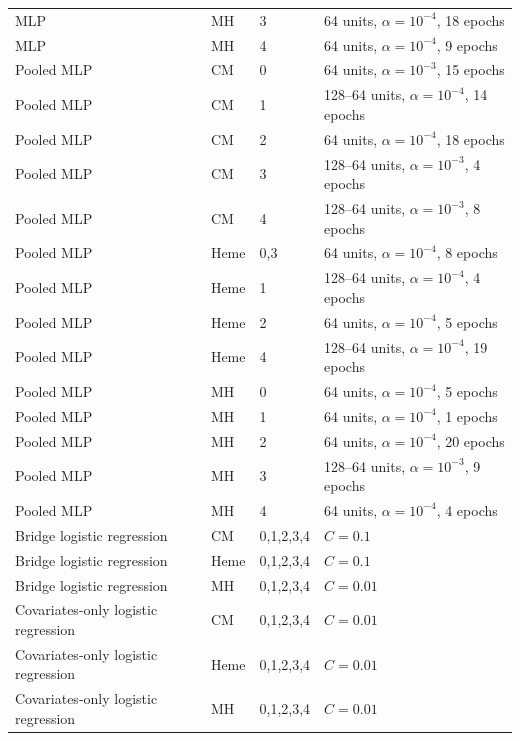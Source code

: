 \begin{tabular}{llll}
MLP & MH & 3 & 64 units, $\alpha=10^{-4}$, 18 epochs \\
MLP & MH & 4 & 64 units, $\alpha=10^{-4}$, 9 epochs \\
Pooled MLP & CM & 0 & 64 units, $\alpha=10^{-3}$, 15 epochs \\
Pooled MLP & CM & 1 & 128--64 units, $\alpha=10^{-4}$, 14 epochs \\
Pooled MLP & CM & 2 & 64 units, $\alpha=10^{-4}$, 18 epochs \\
Pooled MLP & CM & 3 & 128--64 units, $\alpha=10^{-3}$, 4 epochs \\
Pooled MLP & CM & 4 & 128--64 units, $\alpha=10^{-3}$, 8 epochs \\
Pooled MLP & Heme & 0,3 & 64 units, $\alpha=10^{-4}$, 8 epochs \\
Pooled MLP & Heme & 1 & 128--64 units, $\alpha=10^{-4}$, 4 epochs \\
Pooled MLP & Heme & 2 & 64 units, $\alpha=10^{-4}$, 5 epochs \\
Pooled MLP & Heme & 4 & 128--64 units, $\alpha=10^{-4}$, 19 epochs \\
Pooled MLP & MH & 0 & 64 units, $\alpha=10^{-4}$, 5 epochs \\
Pooled MLP & MH & 1 & 64 units, $\alpha=10^{-4}$, 1 epochs \\
Pooled MLP & MH & 2 & 64 units, $\alpha=10^{-4}$, 20 epochs \\
Pooled MLP & MH & 3 & 128--64 units, $\alpha=10^{-3}$, 9 epochs \\
Pooled MLP & MH & 4 & 64 units, $\alpha=10^{-4}$, 4 epochs \\
Bridge logistic regression & CM & 0,1,2,3,4 & $C=0.1$ \\
Bridge logistic regression & Heme & 0,1,2,3,4 & $C=0.1$ \\
Bridge logistic regression & MH & 0,1,2,3,4 & $C=0.01$ \\
Covariates-only logistic regression & CM & 0,1,2,3,4 & $C=0.01$ \\
Covariates-only logistic regression & Heme & 0,1,2,3,4 & $C=0.01$ \\
Covariates-only logistic regression & MH & 0,1,2,3,4 & $C=0.01$ \\
\hline
\end{tabular}
